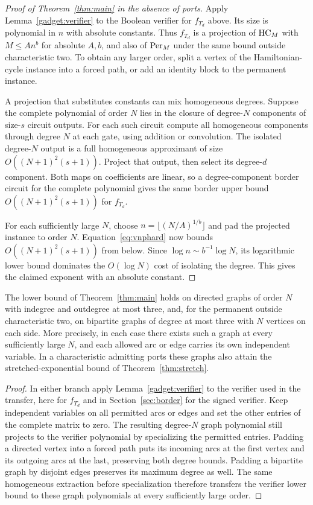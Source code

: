 \begin{proof}[Proof of Theorem~\ref{thm:main} in the absence of ports]
Apply Lemma~\ref{gadget:verifier} to the Boolean verifier for $f_{T_d}$
above. Its size is polynomial in $n$ with absolute constants. Thus
$f_{T_d}$ is a projection of $\mathrm{HC}_M$ with $M\le A n^b$ for absolute
$A,b$, and also of $\mathrm{Per}_M$ under the same bound outside
characteristic two. To obtain any larger order, split a vertex of
the Hamiltonian-cycle instance into a forced path, or add an identity
block to the permanent instance.

A projection that substitutes constants can mix homogeneous degrees.
Suppose the complete polynomial of order $N$ lies in the closure
of degree-$N$ components of size-$s$ circuit outputs. For each such
circuit compute all homogeneous components through degree $N$ at each
gate, using addition or convolution. The isolated
degree-$N$ output is a full homogeneous approximant of size
$O((N+1)^2(s+1))$. Project that output, then select its degree-$d$
component. Both maps on coefficients are linear, so a degree-component
border circuit for the complete polynomial gives the same border
upper bound $O((N+1)^2(s+1))$ for $f_{T_d}$.

For each sufficiently large $N$, choose $n=\lfloor(N/A)^{1/b}\rfloor$
and pad the projected instance to order $N$. Equation~\eqref{eq:vnphard}
now bounds $O((N+1)^2(s+1))$ from below. Since $\log n\sim b^{-1}\log N$,
its logarithmic lower bound dominates the $O(\log N)$ cost of
isolating the degree. This gives the claimed exponent with an
absolute constant.
\end{proof}

\begin{corollary}\label{cor:sparse-support}
The lower bound of Theorem~\ref{thm:main} holds on directed graphs of
order $N$ with indegree and outdegree at most three, and, for the
permanent outside characteristic two, on bipartite graphs of degree
at most three with $N$ vertices on each side. More precisely, in each
case there exists such a graph at every sufficiently large $N$, and
each allowed arc or edge carries its own independent variable. In a
characteristic admitting ports these graphs also attain the
stretched-exponential bound of Theorem~\ref{thm:stretch}.
\end{corollary}

\begin{proof}
In either branch apply Lemma~\ref{gadget:verifier} to the verifier
used in the transfer, here for $f_{T_d}$ and in Section~\ref{sec:border}
for the signed verifier. Keep independent variables on all permitted
arcs or edges and set the other entries of the complete matrix to zero.
The resulting degree-$N$ graph polynomial still projects to the verifier
polynomial by specializing the permitted entries. Padding a directed
vertex into a forced path puts its incoming arcs at the first vertex
and its outgoing arcs at the last, preserving both degree bounds.
Padding a bipartite graph by disjoint edges preserves its maximum
degree as well. The same homogeneous extraction before specialization
therefore transfers the verifier lower bound to these graph polynomials
at every sufficiently large order.
\end{proof}
